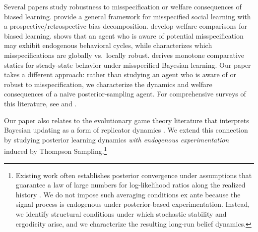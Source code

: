 \documentclass[12pt]{article}
\begin{document}
Several papers study robustness to misspecification or welfare consequences of biased learning. \citet{bohrenLearningHeterogeneousMisspecified2021} provide a general framework for misspecified social learning with a prospective/retrospective bias decomposition. \citet{frickWelfareComparisonsBiased2024} develop welfare comparisons for biased learning. \citet{lanzaniDynamicConcernMisspecification2025} shows that an agent who is aware of potential misspecification may exhibit endogenous behavioral cycles, while \citet{baRobustMisspecifiedModels2023} characterizes which misspecifications are globally vs.\ locally robust. \citet{ghoshRobustComparativeStatics2025} derives monotone comparative statics for steady-state behavior under misspecified Bayesian learning. Our paper takes a different approach: rather than studying an agent who is aware of or robust to misspecification, we characterize the dynamics and welfare consequences of a naive posterior-sampling agent. For comprehensive surveys of this literature, see \citet{bohrenMisspecifiedModelsLearning2025} and \citet{espondaLearningEquilibriumModel2026}.

Our paper also relates to the evolutionary game theory literature that interprets Bayesian updating as a form of replicator dynamics \citep{shaliziDynamicsBayesianUpdating2009,weibullEvolutionaryGameTheory1997,heMisspecifiedLearningEvolutionary2025}. We extend this connection by studying posterior learning dynamics \emph{with endogenous experimentation} induced by Thompson Sampling.\footnote{%
Existing work often establishes posterior convergence under assumptions that guarantee a law of large numbers for log-likelihood ratios along the realized history \citep[e.g.,][]{shaliziDynamicsBayesianUpdating2009}. We do not impose such averaging conditions ex ante because the signal process is endogenous under posterior-based experimentation. Instead, we identify structural conditions under which stochastic stability and ergodicity arise, and we characterize the resulting long-run belief dynamics.}
\end{document}
